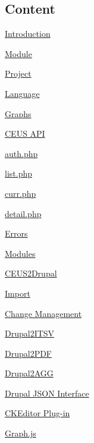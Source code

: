 \hypertarget{index_pageTOC}{}\subsection{Content}\label{index_pageTOC}

\begin{DoxyEnumerate}
\item \hyperlink{index_Introduction}{Introduction}
\begin{DoxyEnumerate}
\item \hyperlink{index_Module_Intro}{Module}
\item \hyperlink{index_Project_Intro}{Project}
\item \hyperlink{index_Language}{Language}
\item \hyperlink{index_Graphs}{Graphs}
\end{DoxyEnumerate}
\item \hyperlink{index_ceusapi}{C\+E\+U\+S A\+P\+I}
\begin{DoxyEnumerate}
\item \hyperlink{index_auth}{auth.\+php}
\item \hyperlink{index_list}{list.\+php}
\item \hyperlink{index_curr}{curr.\+php}
\item \hyperlink{index_detail}{detail.\+php}
\item \hyperlink{index_Errors}{Errors}
\end{DoxyEnumerate}
\item \hyperlink{index_Modules}{Modules}
\begin{DoxyEnumerate}
\item \hyperlink{index_CEUS2Drupal}{C\+E\+U\+S2\+Drupal}
\begin{DoxyEnumerate}
\item \hyperlink{index_Import}{Import}
\item \hyperlink{index_change_management}{Change Management}
\end{DoxyEnumerate}
\item \hyperlink{index_Drupal2ITSV}{Drupal2\+I\+T\+S\+V}
\item \hyperlink{index_Drupal2PDF}{Drupal2\+P\+D\+F}
\item \hyperlink{index_Drupal2AGG}{Drupal2\+A\+G\+G}
\begin{DoxyEnumerate}
\item \hyperlink{index_json}{Drupal J\+S\+O\+N Interface}
\item \hyperlink{index_plugin}{C\+K\+Editor Plug-\/in}
\item \hyperlink{index_graph}{Graph.\+js}

\end{DoxyEnumerate}
\end{DoxyEnumerate}
\end{DoxyEnumerate}
